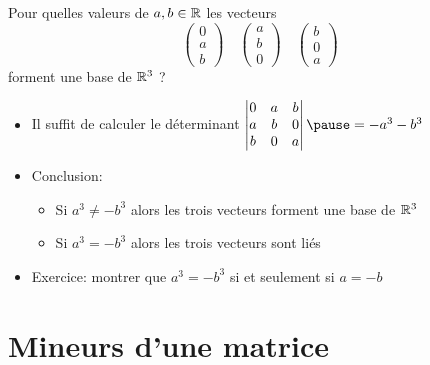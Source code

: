 \begin{frame}
\begin{exemple}
Pour quelles valeurs de $a,b \in \mathbb{R}$ les vecteurs 
$$
\begin{pmatrix}0\\a\\b\end{pmatrix} \quad
\begin{pmatrix}a\\b\\0\end{pmatrix} \quad
\begin{pmatrix}b\\0\\a\end{pmatrix}$$
forment une base de $\mathbb{R}^3$ ?  

\begin{itemize}
  \item\pause  Il suffit de calculer le déterminant \quad 
$
\begin{vmatrix}
  0 & a & b\\a & b & 0\\b & 0 & a  
  \end{vmatrix}
\pause = - a^3 - b^3 
$
  \item\pause  Conclusion: 
\begin{itemize}
  \item\pause  Si $a^3 \neq - b^3$ alors les trois vecteurs forment une base de $\mathbb{R}^3$
  \item\pause  Si $a^3 = - b^3$ alors les trois vecteurs sont liés
\end{itemize}  
  \item\pause  Exercice: montrer que $a^3=-b^3$ si et seulement si $a=-b$
\end{itemize}
\end{exemple}
\end{frame}



\section{Mineurs d'une matrice}

